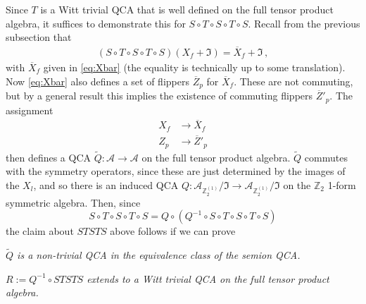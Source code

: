 \documentclass[aps,twocolumn,prx,floatfix,preprintnumbers, nofootinbib,10pt]{revtex4-2}
\numberwithin{equation}{section}
\theoremstyle{definition}
\theoremstyle{remark}
\theoremstyle{claim}
\newcommand{\be}{\begin{equation}}
\newcommand{\ee}{\end{equation}}
\newcommand{\Z}{{\mathbb Z}}
\newcommand{\mc}[1]{\mathcal{#1}}
\newcommand{\paren}[1]{\left( #1 \right)}
\begin{document}
Since $T$ is a Witt trivial QCA that is well defined on the full tensor product algebra, it suffices to demonstrate this for $S \circ T \circ S \circ T \circ S$. Recall from the previous subsection that 
\begin{align}
 (S \circ T \circ S \circ T \circ S)(X_f + \mathfrak{I}) = \overline{X}_f + \mathfrak{I} \,,
\end{align}
with ${\overline{X}}_f$ given in \eqref{eq:Xbar} (the equality is technically up to some translation).  Now \eqref{eq:Xbar} also defines a set of flippers ${\overline{Z}}_p$ for ${\overline{X}}_f$.  These are not commuting, but by a general result \cite{HaahFidkowskiHastings2023} this implies the existence of commuting flippers ${\overline{Z}}'_p$.  The assignment
\begin{align}
X_f &\rightarrow {\overline{X}}_f \\
Z_p &\rightarrow {\overline{Z}}'_p
\end{align}
then defines a QCA $\tilde{Q} : \mc{A} \rightarrow \mc{A}$ on the full tensor product algebra.  $\tilde{Q}$ commutes with the symmetry operators, since these are just determined by the images of the $X_l$, and so there is an induced QCA $Q : \mc{A}_{\Z_2^{(1)}} / \mathfrak{I} \rightarrow \mc{A}_{\Z_2^{(1)}} / \mathfrak{I}$ on the $\Z_2$ 1-form symmetric algebra.  Then, since
\be
S \circ T \circ S \circ T \circ S = Q \circ \paren{Q^{-1} \circ S \circ T \circ S \circ T \circ S }
\ee
the claim about $STSTS$ above follows if we can prove 

 \textit{$\tilde{Q}$ is a non-trivial QCA in the equivalence class of the semion QCA.}

 \textit{$R:=Q^{-1} \circ STSTS$ extends to a Witt trivial QCA on the full tensor product algebra.}
\end{document}
